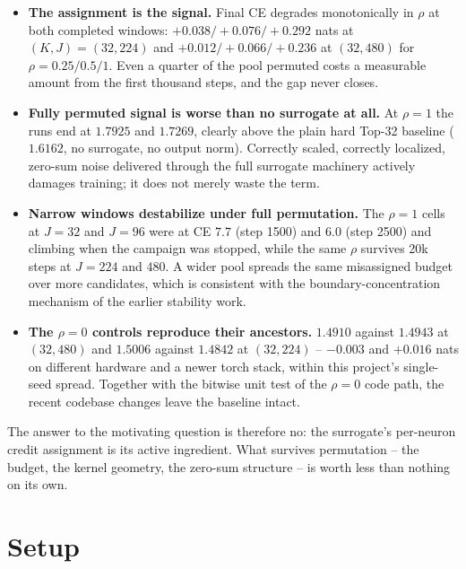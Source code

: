 \documentclass[11pt,a4paper]{article}
\begin{document}
\begin{itemize}[leftmargin=1.4em]
\item \textbf{The assignment is the signal.} Final CE degrades monotonically
in $\rho$ at both completed windows: $+0.038/+0.076/+0.292$ nats at
$(K,J)=(32,224)$ and $+0.012/+0.066/+0.236$ at $(32,480)$ for
$\rho = 0.25/0.5/1$. Even a quarter of the pool permuted costs a measurable
amount from the first thousand steps, and the gap never closes.

\item \textbf{Fully permuted signal is worse than no surrogate at all.} At
$\rho = 1$ the runs end at $1.7925$ and $1.7269$, clearly above the plain
hard Top-32 baseline ($1.6162$, no surrogate, no output norm). Correctly
scaled, correctly localized, zero-sum noise delivered through the full
surrogate machinery actively damages training; it does not merely waste the
term.

\item \textbf{Narrow windows destabilize under full permutation.} The
$\rho = 1$ cells at $J = 32$ and $J = 96$ were at CE $7.7$ (step 1500) and
$6.0$ (step 2500) and climbing when the campaign was stopped, while the same
$\rho$ survives 20k steps at $J = 224$ and $480$. A wider pool spreads the
same misassigned budget over more candidates, which is consistent with the
boundary-concentration mechanism of the earlier stability work.

\item \textbf{The $\rho = 0$ controls reproduce their ancestors.} $1.4910$
against $1.4943$ at $(32,480)$ and $1.5006$ against $1.4842$ at $(32,224)$ --
$-0.003$ and $+0.016$ nats on different hardware and a newer torch stack,
within this project's single-seed spread. Together with the bitwise unit
test of the $\rho = 0$ code path, the recent codebase changes leave the
baseline intact.
\end{itemize}

The answer to the motivating question is therefore no: the surrogate's
per-neuron credit assignment is its active ingredient. What survives
permutation -- the budget, the kernel geometry, the zero-sum structure -- is
worth less than nothing on its own.

\section{Setup}
\end{document}
